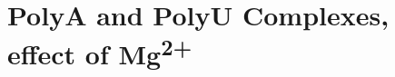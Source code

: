 \section[\texorpdfstring{%
    PolyA and PolyU Complexes, effect of Mg\textsuperscript{2+}
}{%
    PolyA and PolyU Complexes, effect of
		Mg\texttwosuperior\textplussuperior
}]{%
    PolyA and PolyU Complexes, effect of Mg\textsuperscript{2+}
}%
